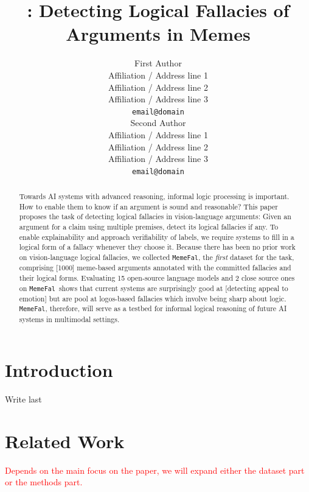 \documentclass[11pt]{article}
\title{{\corpus}: Detecting Logical Fallacies of Arguments in Memes}
\author{First Author \\
  Affiliation / Address line 1 \\
  Affiliation / Address line 2 \\
  Affiliation / Address line 3 \\
  \texttt{email@domain} \\\And
  Second Author \\
  Affiliation / Address line 1 \\
  Affiliation / Address line 2 \\
  Affiliation / Address line 3 \\
  \texttt{email@domain} \\}
\newcommand{\corpus}{{\tt MemeFal}}
\newcommand{\red}[1]{\textcolor{red}{#1}}
\begin{document}
\maketitle
\begin{abstract}
Towards AI systems with advanced reasoning, informal logic processing is important. How to enable them to know if an argument is sound and reasonable? 
This paper proposes the task of detecting logical fallacies in vision-language arguments: Given an argument for a claim using multiple premises, detect its logical fallacies if any.
To enable explainability and approach verifiability of labels, we require systems to fill in a logical form of a fallacy whenever they choose it.
Because there has been no prior work on vision-language logical fallacies, we collected {\corpus}, the \textit{first} dataset for the task, comprising [1000] meme-based arguments annotated with the committed fallacies and their logical forms.
Evaluating 15 open-source language models and 2 close source ones on \corpus\ shows that current systems are surprisingly good at [detecting appeal to emotion] but are pool at logos-based fallacies which involve being sharp about logic. {\corpus}, therefore, will serve as a testbed for informal logical reasoning of future AI systems in multimodal settings.
\end{abstract}

\section{Introduction}

Write last




\section{Related Work}

\red{Depends on the main focus on the paper, we will expand either the dataset part or the methods part.}

\end{document}
